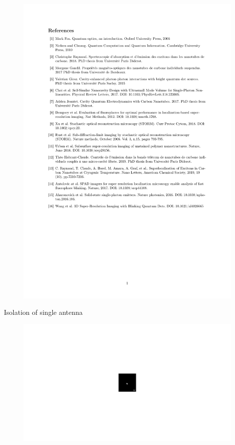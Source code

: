 \documentclass[xcolor = {dvipsnames}]{beamer}
\begin{document}
\begin{frame}
\vspace{-1cm}
	\begin{figure}[h!]
	\centering
	\includegraphics[width=.9\textwidth]{images/Bibliography}
	\end{figure}
\end{frame}

\begin{frame}{Isolation of single antenna}
\begin{figure}
\centering
\includegraphics[width=.4\textwidth]{images/antenna_2}
\end{figure}
\end{frame}
\end{document}
